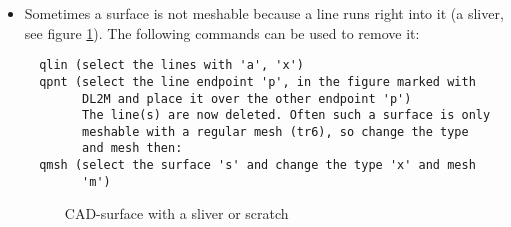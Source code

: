 \documentclass{article}
\begin{document}
\begin{appendix}
\begin{itemize}
\item Sometimes a surface is not meshable because a line runs right into it (a sliver, see figure \ref{sliver}). The following commands can be used to remove it:
\begin{verbatim}
  qlin (select the lines with 'a', 'x')
  qpnt (select the line endpoint 'p', in the figure marked with
        DL2M and place it over the other endpoint 'p')
        The line(s) are now deleted. Often such a surface is only
        meshable with a regular mesh (tr6), so change the type
        and mesh then:
  qmsh (select the surface 's' and change the type 'x' and mesh
        'm')
\end{verbatim}

  \begin{figure}[h]
\caption{\label{sliver} CAD-surface with a sliver or scratch }
\end{figure}

\end{itemize}


\end{appendix}
\end{document}
